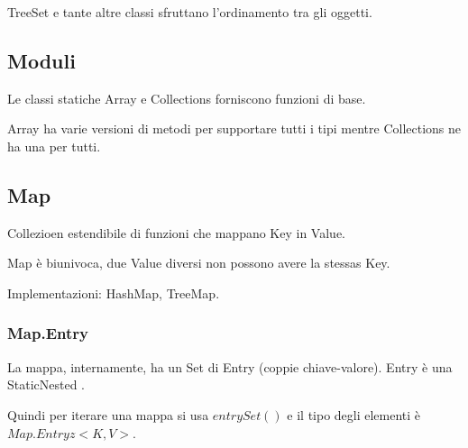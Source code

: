 TreeSet e tante altre classi sfruttano l'ordinamento tra gli oggetti.

\subsection{Moduli}
Le classi statiche Array e Collections forniscono funzioni di base.

Array ha varie versioni di metodi per supportare tutti i tipi mentre Collections ne ha una per tutti.

\subsection{Map}
Collezioen estendibile di funzioni che mappano  Key in Value.


Map è biunivoca, due Value diversi non possono avere la stessas Key.

Implementazioni: HashMap, TreeMap.

\subsubsection{Map.Entry}
La mappa, internamente, ha un Set di Entry (coppie chiave-valore). Entry è una StaticNested .


Quindi per iterare una mappa si usa $entrySet()$ e il tipo degli elementi è $Map.Entryz<K, V>$.